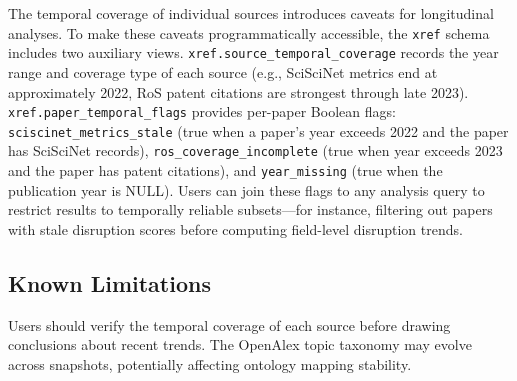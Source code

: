 The temporal coverage of individual sources introduces caveats for
longitudinal analyses. To make these caveats programmatically accessible,
the \texttt{xref} schema includes two auxiliary views.
\texttt{xref.source\_temporal\_coverage} records the year range and
coverage type of each source (e.g., SciSciNet metrics end at approximately
2022, RoS patent citations are strongest through late 2023).
\texttt{xref.paper\_temporal\_flags} provides per-paper Boolean flags:
\texttt{sciscinet\_metrics\_stale} (true when a paper's year exceeds 2022
and the paper has SciSciNet records), \texttt{ros\_coverage\_incomplete}
(true when year exceeds 2023 and the paper has patent citations), and
\texttt{year\_missing} (true when the publication year is NULL). Users can
join these flags to any analysis query to restrict results to temporally
reliable subsets---for instance, filtering out papers with stale disruption
scores before computing field-level disruption trends.

\subsection{Known Limitations}

Users should verify the temporal coverage of each source before drawing
conclusions about recent trends. The OpenAlex topic taxonomy may evolve
across snapshots, potentially affecting ontology mapping stability.
